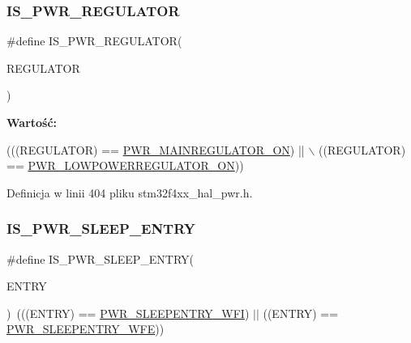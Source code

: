 \subsubsection{\texorpdfstring{I\+S\+\_\+\+P\+W\+R\+\_\+\+R\+E\+G\+U\+L\+A\+T\+OR}{IS\_PWR\_REGULATOR}}
{\footnotesize\ttfamily \#define I\+S\+\_\+\+P\+W\+R\+\_\+\+R\+E\+G\+U\+L\+A\+T\+OR(\begin{DoxyParamCaption}\item[{}]{R\+E\+G\+U\+L\+A\+T\+OR }\end{DoxyParamCaption})}

{\bfseries Wartość\+:}
\begin{DoxyCode}
(((REGULATOR) == \hyperlink{group___p_w_r___regulator__state__in___s_t_o_p__mode_ga1d5b4e1482184286e28c16162f530039}{PWR\_MAINREGULATOR\_ON}) || \(\backslash\)
                                     ((REGULATOR) == \hyperlink{group___p_w_r___regulator__state__in___s_t_o_p__mode_gab9922a15f8414818d736d5e7fcace963}{PWR\_LOWPOWERREGULATOR\_ON}))
\end{DoxyCode}


Definicja w linii 404 pliku stm32f4xx\+\_\+hal\+\_\+pwr.\+h.

\mbox{\label{group___p_w_r___i_s___p_w_r___definitions_ga9b36a9c213a77d36340788b2e7e277ff}} 
\subsubsection{\texorpdfstring{I\+S\+\_\+\+P\+W\+R\+\_\+\+S\+L\+E\+E\+P\+\_\+\+E\+N\+T\+RY}{IS\_PWR\_SLEEP\_ENTRY}}
{\footnotesize\ttfamily \#define I\+S\+\_\+\+P\+W\+R\+\_\+\+S\+L\+E\+E\+P\+\_\+\+E\+N\+T\+RY(\begin{DoxyParamCaption}\item[{}]{E\+N\+T\+RY }\end{DoxyParamCaption})~(((E\+N\+T\+RY) == \hyperlink{group___p_w_r___s_l_e_e_p__mode__entry_ga4f0f99a3526c57efb3501b016639fa45}{P\+W\+R\+\_\+\+S\+L\+E\+E\+P\+E\+N\+T\+R\+Y\+\_\+\+W\+FI}) $\vert$$\vert$ ((E\+N\+T\+RY) == \hyperlink{group___p_w_r___s_l_e_e_p__mode__entry_ga2ef4bd42ad37dcfcd0813676087d559e}{P\+W\+R\+\_\+\+S\+L\+E\+E\+P\+E\+N\+T\+R\+Y\+\_\+\+W\+FE}))}



